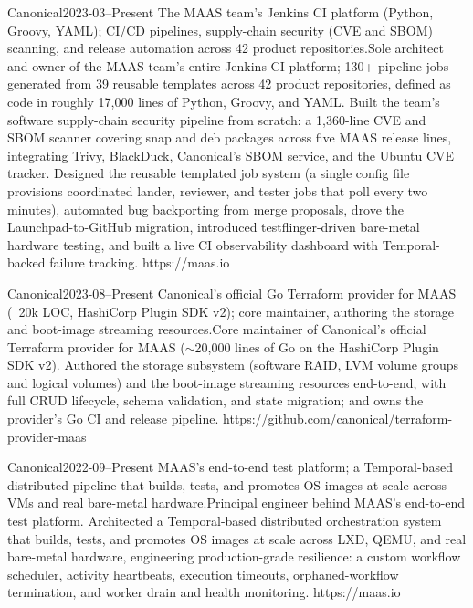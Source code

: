 {Canonical}{2023-03--Present}
{\iflean The MAAS team's Jenkins CI platform (Python, Groovy, YAML); CI/CD pipelines, supply-chain security (CVE and SBOM) scanning, and release automation across 42 product repositories.\else Sole architect and owner of the MAAS team's entire Jenkins CI platform; 130+ pipeline jobs generated from 39 reusable templates across 42 product repositories, defined as code in roughly 17,000 lines of Python, Groovy, and YAML. Built the team's software supply-chain security pipeline from scratch: a 1,360-line CVE and SBOM scanner covering snap and deb packages across five MAAS release lines, integrating Trivy, BlackDuck, Canonical's SBOM service, and the Ubuntu CVE tracker. Designed the reusable templated job system (a single config file provisions coordinated lander, reviewer, and tester jobs that poll every two minutes), automated bug backporting from merge proposals, drove the Launchpad-to-GitHub migration, introduced testflinger-driven bare-metal hardware testing, and built a live CI observability dashboard with Temporal-backed failure tracking.\fi}
{https://maas.io}

{Canonical}{2023-08--Present}
{\iflean Canonical's official Go Terraform provider for MAAS (~20k LOC, HashiCorp Plugin SDK v2); core maintainer, authoring the storage and boot-image streaming resources.\else Core maintainer of Canonical's official Terraform provider for MAAS ($\sim$20,000 lines of Go on the HashiCorp Plugin SDK v2). Authored the storage subsystem (software RAID, LVM volume groups and logical volumes) and the boot-image streaming resources end-to-end, with full CRUD lifecycle, schema validation, and state migration; and owns the provider's Go CI and release pipeline.\fi}
{https://github.com/canonical/terraform-provider-maas}

{Canonical}{2022-09--Present}
{\iflean MAAS's end-to-end test platform; a Temporal-based distributed pipeline that builds, tests, and promotes OS images at scale across VMs and real bare-metal hardware.\else Principal engineer behind MAAS's end-to-end test platform. Architected a Temporal-based distributed orchestration system that builds, tests, and promotes OS images at scale across LXD, QEMU, and real bare-metal hardware, engineering production-grade resilience: a custom workflow scheduler, activity heartbeats, execution timeouts, orphaned-workflow termination, and worker drain and health monitoring.\fi}
{https://maas.io}

